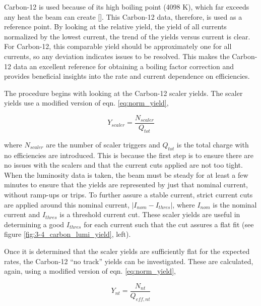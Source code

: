 \documentclass[
]{report}
\begin{document}
Carbon-12 is used because of its high boiling point (4098 K), which far
exceeds any heat the beam can create
{[}\cite{thomas_jefferson_national_accelerator_facility_-_office_of_science_education_its_2023}{]}.
This Carbon-12 data, therefore, is used as a reference point. By looking
at the relative yield, the yield of all currents normalized by the
lowest current, the trend of the yields versus current is clear. For
Carbon-12, this comparable yield should be approximately one for all
currents, so any deviation indicates issues to be resolved. This makes
the Carbon-12 data an excellent reference for obtaining a boiling factor
correction and provides beneficial insights into the rate and current
dependence on efficiencies.

The procedure begins with looking at the Carbon-12 scaler yields. The
scaler yields use a modified version of eqn. \ref{eq:norm_yield},

\begin{equation} 
  Y_{scaler}=\frac{N_{scaler}}{Q_{tot}}
  \label{eq:scaler_yield} 
\end{equation}

\noindent where \(N_{scaler}\) are the number of scaler triggers and
\(Q_{tot}\) is the total charge with no efficiencies are introduced.
This is because the first step is to ensure there are no issues with the
scalers and that the current cuts applied are not too tight. When the
luminosity data is taken, the beam must be steady for at least a few
minutes to ensure that the yields are represented by just that nominal
current, without ramp-ups or trips. To further assure a stable current,
strict current cuts are applied around this nominal current,
\(\left|I_{nom}-I_{thres}\right|\), where \(I_{nom}\) is the nominal
current and \(I_{thres}\) is a threshold current cut. These scaler
yields are useful in determining a good \(I_{thres}\) for each current
such that the cut assures a flat fit (see figure
\ref{fig:3-4_carbon_lumi_yield}, left).



Once it is determined that the scaler yields are sufficiently flat for
the expected rates, the Carbon-12 ``no track'' yields can be
investigated. These are calculated, again, using a modified version of
eqn. \ref{eq:norm_yield},

\begin{equation} 
  Y_{nt}=\frac{N_{nt}}{Q_{eff,nt}}
  \label{eq:nt_yield} 
\end{equation}
\end{document}
